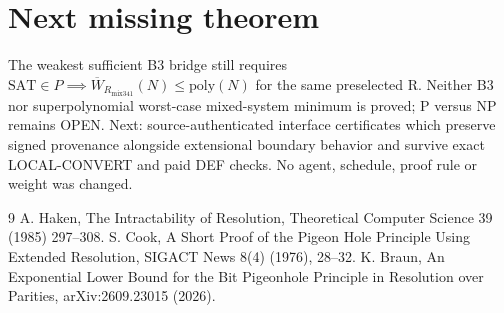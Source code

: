 \documentclass[11pt]{article}
\begin{document}
\section*{Next missing theorem}
The weakest sufficient B3 bridge still requires \(\mathrm{SAT}\in P\implies \overline W_{R_{\mathrm{mix341}}}(N)\le\mathrm{poly}(N)\) for the same preselected R. Neither B3 nor superpolynomial worst-case mixed-system minimum is proved; P versus NP remains OPEN. Next: source-authenticated interface certificates which preserve signed provenance alongside extensional boundary behavior and survive exact LOCAL-CONVERT and paid DEF checks. No agent, schedule, proof rule or weight was changed.
\begin{thebibliography}{9}
 A. Haken, The Intractability of Resolution, Theoretical Computer Science 39 (1985) 297--308.
 S. Cook, A Short Proof of the Pigeon Hole Principle Using Extended Resolution, SIGACT News 8(4) (1976), 28--32.
 K. Braun, An Exponential Lower Bound for the Bit Pigeonhole Principle in Resolution over Parities, arXiv:2609.23015 (2026).
\end{thebibliography}
\end{document}
